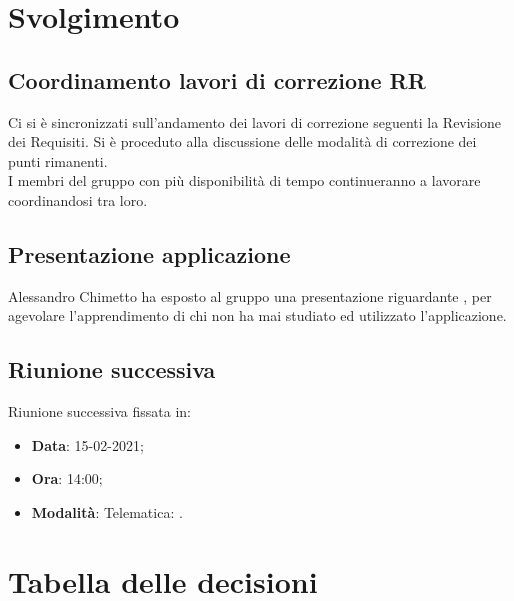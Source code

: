\documentclass[]{article}
\begin{document}
	\newpage

	\section{Svolgimento}
		\subsection{Coordinamento lavori di correzione RR}
		Ci si è sincronizzati sull'andamento dei lavori di correzione seguenti la Revisione dei Requisiti. Si è proceduto alla discussione delle modalità di correzione dei punti rimanenti.\\
		I membri del gruppo con più disponibilità di tempo continueranno a lavorare coordinandosi tra loro.\\
		
		
		\subsection{Presentazione applicazione }
		Alessandro Chimetto ha esposto al gruppo una presentazione riguardante , per agevolare l'apprendimento di chi non ha mai studiato ed utilizzato l'applicazione.\\		
		
	\subsection{Riunione successiva}
	Riunione successiva fissata in:
	\begin{itemize}
		\item \textbf{Data}: 15-02-2021;
		\item \textbf{Ora}: 14:00;
		\item \textbf{Modalità}: Telematica: .
	\end{itemize}
		
	\newpage
	
	\section{Tabella delle decisioni}
	
\end{document}
